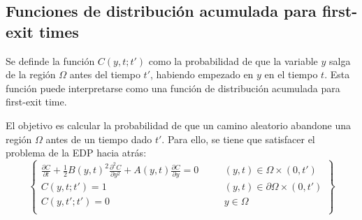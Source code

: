 \subsection{Funciones de distribución acumulada para first-exit times}
Se definde la función $C(y, t; t')$ como la probabilidad de que la variable $y$ salga de la región $\Omega$ antes del tiempo $t'$, habiendo empezado en $y$ en el tiempo $t$. Esta función puede interpretarse como una función de distribución acumulada para first-exit time. 

El objetivo es calcular la probabilidad de que un camino aleatorio abandone una región $\Omega$ antes de un tiempo dado $t'$. Para ello, se tiene que satisfacer el problema de la EDP hacia atrás:
\begin{equation}\label{eq:CumulatFirstExitTime}
    \boxed{
    \left\{
    \begin{array}{rlrl}
        \displaystyle\frac{\partial C}{\partial t} + \frac{1}{2} B(y, t)^2 \frac{\partial^2 C}{\partial y^2} + A(y, t) \frac{\partial C}{\partial y} = 0 &\quad& (y,t) \in \Omega\times(0, t') \\[2ex]
        C(y, t; t') = 1 && (y,t) \in \partial\Omega\times(0, t') \\[2ex]
        C(y, t'; t') = 0 && y \in \Omega \\
    \end{array}
    \right\}
    }
\end{equation}




